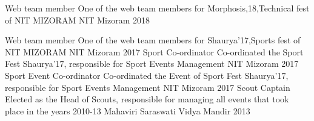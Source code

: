 \begin{cvhonors}
  \cvhonor
    {Web team member}
    {One of the web team members for Morphosis,18,Technical fest of NIT MIZORAM}
    {NIT Mizoram}
    {2018}

  \cvhonor
    {Web team member}
    {One of the web team members for Shaurya'17,Sports fest of NIT MIZORAM}
    {NIT Mizoram}
    {2017}
  \cvhonor
    {Sport Co-ordinator}
    {Co-ordinated the Sport Fest Shaurya'17, responsible for Sport Events Management}
    {NIT Mizoram}
    {2017}
    \cvhonor
    {Sport Event Co-ordinator}
    {Co-ordinated the Event of Sport Fest Shaurya'17, responsible for Sport Events Management}
    {NIT Mizoram}
    {2017}
  \cvhonor
    {Scout Captain}
    {Elected as the Head of Scouts, responsible for managing all events
 	that took place in the years 2010-13}
    {Mahaviri Saraswati Vidya Mandir}
    {2013}
\end{cvhonors}